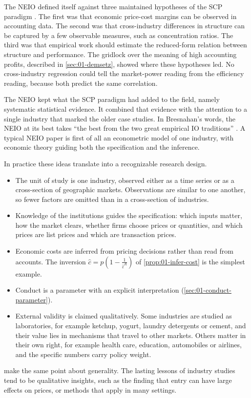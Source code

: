 The NEIO defined itself against three maintained hypotheses of the SCP paradigm \citep[pp.~1012--1013]{Bresnahan1989}.
The first was that economic price-cost margins can be observed in accounting data. The second was that
cross-industry differences in structure can be captured by a few observable measures, such as concentration ratios.
The third was that empirical work should estimate the reduced-form relation between structure and performance.
The gridlock over the meaning of high accounting profits, described in \cref{sec:01-demsetz}, showed where these
hypotheses led. No cross-industry regression could tell the market-power reading from the efficiency reading,
because both predict the same correlation.

The NEIO kept what the SCP paradigm had added to the field, namely systematic statistical evidence. It combined that
evidence with the attention to a single industry that marked the older case studies. In Bresnahan's words, the NEIO at
its best takes ``the best from the two great empirical IO traditions'' \citep[p.~1013]{Bresnahan1989}. A typical NEIO
paper is first of all an econometric model of one industry, with economic theory guiding both the specification and
the inference.

In practice these ideas translate into a recognizable research design.
\begin{itemize}
\item The unit of study is one industry, observed either as a time series or as a cross-section of geographic markets.
  Observations are similar to one another, so fewer factors are omitted than in a cross-section of industries.
\item Knowledge of the institutions guides the specification: which inputs matter, how the market clears, whether firms
  choose prices or quantities, and which prices are list prices and which are transaction prices.
\item Economic costs are inferred from pricing decisions rather than read from accounts. The inversion
  $\hat c = p\left(1 - \frac{1}{\hat\varepsilon^R}\right)$ of \cref{prop:01-infer-cost} is the simplest example.
\item Conduct is a parameter with an explicit interpretation (\cref{sec:01-conduct-parameter}).
\item External validity is claimed qualitatively. Some industries are studied as laboratories, for example ketchup,
  yogurt, laundry detergents or cement, and their value lies in mechanisms that travel to other markets. Others matter in
  their own right, for example health care, education, automobiles or airlines, and the specific numbers carry policy
  weight.
\end{itemize}
\citet[p.~147]{EinavLevin2010} make the same point about generality. The lasting lessons of industry studies tend to be
qualitative insights, such as the finding that entry can have large effects on prices, or methods that apply in many
settings.

